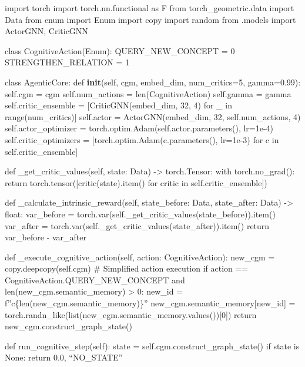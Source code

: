 \documentclass[letterpaper,twocolumn]{article}
\begin{document}
import torch import torch.nn.functional as F from torch\_geometric.data
import Data from enum import Enum import copy import random from .models
import ActorGNN, CriticGNN

class CognitiveAction(Enum): QUERY\_NEW\_CONCEPT = 0
STRENGTHEN\_RELATION = 1

class AgenticCore: def \textbf{init}(self, cgm, embed\_dim,
num\_critics=5, gamma=0.99): self.cgm = cgm self.num\_actions =
len(CognitiveAction) self.gamma = gamma self.critic\_ensemble =
{[}CriticGNN(embed\_dim, 32, 4) for \_ in range(num\_critics){]}
self.actor = ActorGNN(embed\_dim, 32, self.num\_actions, 4)
self.actor\_optimizer = torch.optim.Adam(self.actor.parameters(),
lr=1e-4) self.critic\_optimizers = {[}torch.optim.Adam(c.parameters(),
lr=1e-3) for c in self.critic\_ensemble{]}

def \_get\_critic\_values(self, state: Data) -\textgreater{}
torch.Tensor: with torch.no\_grad(): return
torch.tensor({[}critic(state).item() for critic in
self.critic\_ensemble{]})

def \_calculate\_intrinsic\_reward(self, state\_before: Data,
state\_after: Data) -\textgreater{} float: var\_before =
torch.var(self.\_get\_critic\_values(state\_before)).item() var\_after =
torch.var(self.\_get\_critic\_values(state\_after)).item() return
var\_before - var\_after

def \_execute\_cognitive\_action(self, action: CognitiveAction):
new\_cgm = copy.deepcopy(self.cgm) \# Simplified action execution if
action == CognitiveAction.QUERY\_NEW\_CONCEPT and
len(new\_cgm.semantic\_memory) \textgreater{} 0: new\_id =
f''c\{len(new\_cgm.semantic\_memory)\}''
new\_cgm.semantic\_memory{[}new\_id{]} =
torch.randn\_like(list(new\_cgm.semantic\_memory.values()){[}0{]})
return new\_cgm.construct\_graph\_state()

def run\_cognitive\_step(self): state =
self.cgm.construct\_graph\_state() if state is None: return 0.0,
``NO\_STATE''
\end{document}
